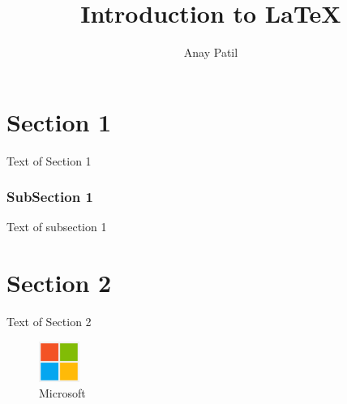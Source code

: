 \documentclass{report}
\begin{document}
    \title{Introduction to \LaTeX{}}
    \author{Anay Patil}

    \maketitle

    \tableofcontents

    \chapter{Section 1}
	Text of Section 1
	\subsection{SubSection 1}
	Text of subsection 1
	\chapter{Section 2}
	Text of Section 2
    \begin{figure}[h]
        \includegraphics[width=50px]{Microsoft_logo.png}
        \centering
        \caption{Microsoft}
    \end{figure}
\end{document}
